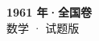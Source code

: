 \documentclass[zihao=-4, a4paper]{ctexart}
\begin{document}
\begin{center}
  {\Large\bfseries 1961 年·全国卷}\\[4pt]
  {\large 数学 · 试题版}
\end{center}
\medskip
{}

\end{document}
